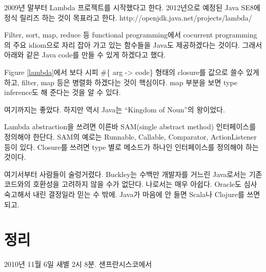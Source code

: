 \documentclass[a4paper]{article}
\begin{document}
2009년 말부터 Lambda 프로젝트를 시작했다고 한다. 2012년으로 예정된
Java SE8에 정식 릴리즈 하는 것이 목표라고 한다.
http://openjdk.java.net/projects/lambda/
 
Filter, sort, map, reduce 등 functional programming에서 cocurrent
programming의 주요 idiom으로 자리 잡아 가고 있는 함수들을 Java도
제공하겠다는 것이다. 그래서 아래와 같은 Java code를 만들 수 있게
하겠다고 했다.
 
Figure \ref{lambda}에서 보다 시피 \#\{ arg -> code\} 형태의 closure를 값으로 
쓸수 있게 하고,
filter, map 등은 병렬화 하겠다는 것이 핵심이다. map 부분을 보면 type
inference도 해 준다는 것을 알 수 있다.
 
여기까지는 좋았다. 하지만 역시 Java는 ``Kingdom of Noun''의 왕이었다.
 
Lambda abstraction을 쓰려면 이른바 SAM(single abstract method)
인터페이스를 정의해야 한단다.  SAM의 예로는 Runnable, Callable,
Comparator, ActionListener 등이 있다. Closure를 쓰려면 type 별로
메소드가 하나인 인터페이스를 정의해야 하는 것이다.
 
여기서부터 사람들이 술렁거렸다. Buckley는 수백만 개발자를 거느린
Java로서는 기존 코드와의 호환성을 고려하지 않을 수가 없단다. 나로서는
매우 아쉽다. Oracle도 심사 숙고해서 내린 결정일라 믿는 수 밖에. Java가
마음에 안 들면 Scala나 Clojure를 쓰면 되고.

\section{정리}

2010년 11월 6일 새별 2시 8분.
샌프란시스코에서
\end{document}
